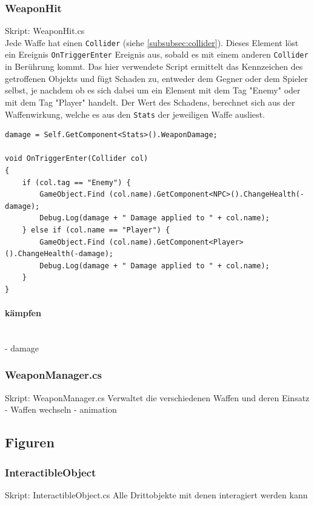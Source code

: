 \subsubsection{WeaponHit}
Skript: WeaponHit.cs\\

Jede Waffe hat einen \lstinline{Collider} (siehe \cref{subsubsec:collider}). Dieses Element löst ein Ereignis \lstinline{OnTriggerEnter} Ereignis aus, sobald es mit einem anderen \lstinline{Collider} in Berührung kommt.
Das hier verwendete Script ermittelt das Kennzeichen des getroffenen Objekts und fügt Schaden zu, entweder dem Gegner oder dem Spieler selbst, je nachdem ob es sich dabei um ein Element mit dem Tag "Enemy" oder mit dem Tag "Player" handelt.
Der Wert des Schadens, berechnet sich aus der Waffenwirkung, welche es aus den \lstinline{Stats} der jeweiligen Waffe ausliest.

\begin{lstlisting}[caption={Waffentreffer}]
damage = Self.GetComponent<Stats>().WeaponDamage;

void OnTriggerEnter(Collider col)
{
	if (col.tag == "Enemy") {
		GameObject.Find (col.name).GetComponent<NPC>().ChangeHealth(-damage);
		Debug.Log(damage + " Damage applied to " + col.name);
	} else if (col.name == "Player") {
		GameObject.Find (col.name).GetComponent<Player>().ChangeHealth(-damage);
		Debug.Log(damage + " Damage applied to " + col.name);
	}
}
\end{lstlisting}

\paragraph{kämpfen}\mbox{} \\
- damage

\subsubsection{WeaponManager.cs}
Skript: WeaponManager.cs
Verwaltet die verschiedenen Waffen und deren Einsatz
- Waffen wechseln
- animation

\subsection{Figuren}


\subsubsection{InteractibleObject}
\label{subsubsec:interactibleobject}
Skript: InteractibleObject.cs
Alle Drittobjekte mit denen interagiert werden kann

